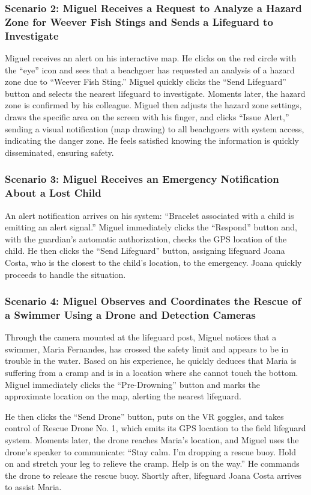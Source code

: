 \subsubsection{\textbf{Scenario 2:} Miguel Receives a Request to Analyze a Hazard Zone for Weever Fish Stings and Sends a Lifeguard to Investigate}
Miguel receives an alert on his interactive map. He clicks on the red circle with the ``eye'' icon and sees that a beachgoer has requested an analysis of a hazard zone due to ``Weever Fish Sting.'' Miguel quickly clicks the ``Send Lifeguard'' button and selects the nearest lifeguard to investigate. Moments later, the hazard zone is confirmed by his colleague. Miguel then adjusts the hazard zone settings, draws the specific area on the screen with his finger, and clicks ``Issue Alert,'' sending a visual notification (map drawing) to all beachgoers with system access, indicating the danger zone. He feels satisfied knowing the information is quickly disseminated, ensuring safety.

\subsubsection{\textbf{Scenario 3:} Miguel Receives an Emergency Notification About a Lost Child}
An alert notification arrives on his system: ``Bracelet associated with a child is emitting an alert signal.'' Miguel immediately clicks the ``Respond'' button and, with the guardian's automatic authorization, checks the GPS location of the child. He then clicks the ``Send Lifeguard'' button, assigning lifeguard Joana Costa, who is the closest to the child's location, to the emergency. Joana quickly proceeds to handle the situation.

\subsubsection{\textbf{Scenario 4:} Miguel Observes and Coordinates the Rescue of a Swimmer Using a Drone and Detection Cameras}
Through the camera mounted at the lifeguard post, Miguel notices that a swimmer, Maria Fernandes, has crossed the safety limit and appears to be in trouble in the water. Based on his experience, he quickly deduces that Maria is suffering from a cramp and is in a location where she cannot touch the bottom. Miguel immediately clicks the ``Pre-Drowning'' button and marks the approximate location on the map, alerting the nearest lifeguard. 

He then clicks the ``Send Drone'' button, puts on the VR goggles, and takes control of Rescue Drone No. 1, which emits its GPS location to the field lifeguard system. Moments later, the drone reaches Maria's location, and Miguel uses the drone's speaker to communicate: 
``Stay calm. I’m dropping a rescue buoy. Hold on and stretch your leg to relieve the cramp. Help is on the way.'' He commands the drone to release the rescue buoy. Shortly after, lifeguard Joana Costa arrives to assist Maria.

